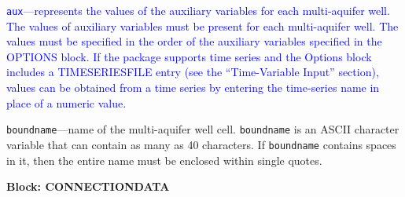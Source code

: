 \begin{description}
\item \textcolor{blue}{\texttt{aux}---represents the values of the auxiliary variables for each multi-aquifer well. The values of auxiliary variables must be present for each multi-aquifer well. The values must be specified in the order of the auxiliary variables specified in the OPTIONS block.  If the package supports time series and the Options block includes a TIMESERIESFILE entry (see the ``Time-Variable Input'' section), values can be obtained from a time series by entering the time-series name in place of a numeric value.}

\item \texttt{boundname}---name of the multi-aquifer well cell.  \texttt{boundname} is an ASCII character variable that can contain as many as 40 characters.  If \texttt{boundname} contains spaces in it, then the entire name must be enclosed within single quotes.

\end{description}
\item \textbf{Block: CONNECTIONDATA}

